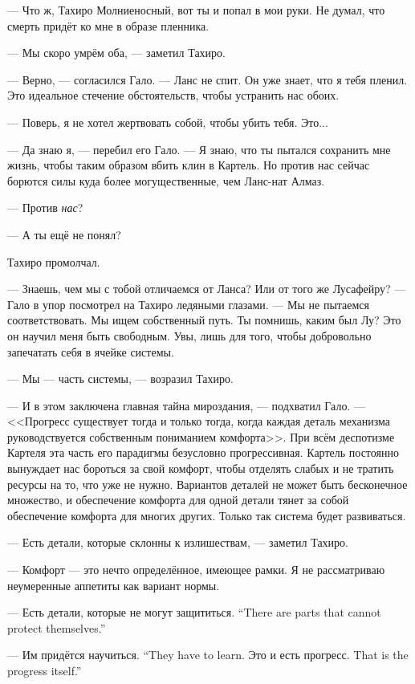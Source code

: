\textspace

--- Что ж, Тахиро Молниеносный, вот ты и попал в мои руки.
Не думал, что смерть придёт ко мне в образе пленника.

--- Мы скоро умрём оба, --- заметил Тахиро.

--- Верно, --- согласился Гало.
--- Ланс не спит.
Он уже знает, что я тебя пленил.
Это идеальное стечение обстоятельств, чтобы устранить нас обоих.

--- Поверь, я не хотел жертвовать собой, чтобы убить тебя.
Это...

--- Да знаю я, --- перебил его Гало.
--- Я знаю, что ты пытался сохранить мне жизнь, чтобы таким образом вбить клин в Картель.
Но против нас сейчас борются силы куда более могущественные, чем Ланс-нат Алмаз.

--- Против \emph{нас}?

--- А ты ещё не понял?

Тахиро промолчал.

--- Знаешь, чем мы с тобой отличаемся от Ланса?
Или от того же Лусафейру? --- Гало в упор посмотрел на Тахиро ледяными глазами.
--- Мы не пытаемся соответствовать.
Мы ищем собственный путь.
Ты помнишь, каким был Лу?
Это он научил меня быть свободным.
Увы, лишь для того, чтобы добровольно запечатать себя в ячейке системы.

--- Мы --- часть системы, --- возразил Тахиро.

--- И в этом заключена главная тайна мироздания, --- подхватил Гало.
--- <<Прогресс существует тогда и только тогда, когда каждая деталь механизма руководствуется собственным пониманием комфорта>>.
При всём деспотизме Картеля эта часть его парадигмы безусловно прогрессивная.
Картель постоянно вынуждает нас бороться за свой комфорт, чтобы отделять слабых и не тратить ресурсы на то, что уже не нужно.
Вариантов деталей не может быть бесконечное множество, и обеспечение комфорта для одной детали тянет за собой обеспечение комфорта для многих других.
Только так система будет развиваться.

--- Есть детали, которые склонны к излишествам, --- заметил Тахиро.

--- Комфорт --- это нечто определённое, имеющее рамки.
Я не рассматриваю неумеренные аппетиты как вариант нормы.

{--- Есть детали, которые не могут защититься.}
{``There are parts that cannot protect themselves.''}

{--- Им придётся научиться.}
{``They have to learn.}
{Это и есть прогресс.}
{That is the progress itself.''}

